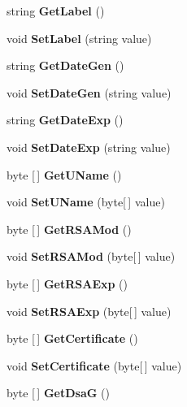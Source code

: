 \begin{DoxyCompactItemize}
\mbox{\label{class_cxi_cega_1_1_key_properties_a1a6faacabd65900deae42216d9fb9f0e}} 
string {\bfseries Get\+Label} ()
\item 
\mbox{\label{class_cxi_cega_1_1_key_properties_a5fe7870a38c3e34e707834fc2546d332}} 
void {\bfseries Set\+Label} (string value)
\item 
\mbox{\label{class_cxi_cega_1_1_key_properties_ae242090680a93c36705a4623e1235f60}} 
string {\bfseries Get\+Date\+Gen} ()
\item 
\mbox{\label{class_cxi_cega_1_1_key_properties_a2a9a5c822dae7ee873812d72de5185a1}} 
void {\bfseries Set\+Date\+Gen} (string value)
\item 
\mbox{\label{class_cxi_cega_1_1_key_properties_ab212660698e6f1f6686d6a91c49ede48}} 
string {\bfseries Get\+Date\+Exp} ()
\item 
\mbox{\label{class_cxi_cega_1_1_key_properties_a81b7661c876e5853bf37f2b3c7c0206f}} 
void {\bfseries Set\+Date\+Exp} (string value)
\item 
\mbox{\label{class_cxi_cega_1_1_key_properties_a2f031e45d15ea999f9c98ddef2d98334}} 
byte [$\,$] {\bfseries Get\+U\+Name} ()
\item 
\mbox{\label{class_cxi_cega_1_1_key_properties_a7a26106a9faee63f70b6dab69cb9c9a2}} 
void {\bfseries Set\+U\+Name} (byte[$\,$] value)
\item 
\mbox{\label{class_cxi_cega_1_1_key_properties_ab0181e67f184e2081963c76fd8eb509d}} 
byte [$\,$] {\bfseries Get\+R\+S\+A\+Mod} ()
\item 
\mbox{\label{class_cxi_cega_1_1_key_properties_a4de0976c0ccc682883ed381251117231}} 
void {\bfseries Set\+R\+S\+A\+Mod} (byte[$\,$] value)
\item 
\mbox{\label{class_cxi_cega_1_1_key_properties_a9154df98c5e9125d6b1ed13dbddd4bae}} 
byte [$\,$] {\bfseries Get\+R\+S\+A\+Exp} ()
\item 
\mbox{\label{class_cxi_cega_1_1_key_properties_a66b2490daf6309c4d519c7ffeafc41d6}} 
void {\bfseries Set\+R\+S\+A\+Exp} (byte[$\,$] value)
\item 
\mbox{\label{class_cxi_cega_1_1_key_properties_a3744ff80426b93ef0028f1a455360b07}} 
byte [$\,$] {\bfseries Get\+Certificate} ()
\item 
\mbox{\label{class_cxi_cega_1_1_key_properties_a17cd9d9e66779a10850b90ee8ee9e390}} 
void {\bfseries Set\+Certificate} (byte[$\,$] value)
\item 
\mbox{\label{class_cxi_cega_1_1_key_properties_a83bf7d542c7fb52010fd5a3bea7476e2}} 
byte [$\,$] {\bfseries Get\+DsaG} ()
\item 

\end{DoxyCompactItemize}
